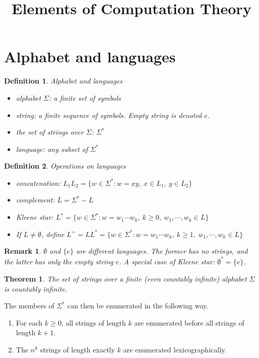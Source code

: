 \documentclass[aps,pra,onecolumn,notitlepage,superscriptaddress]{revtex4-1}
\newtheorem{theo}{Theorem}
\newtheorem{defi}{Definition}
\newtheorem{rem}{Remark}
\begin{document}
    \title{Elements of Computation Theory}
    \author{}
    \maketitle
    
    \section{ Alphabet and languages}
    \begin{defi}
        Alphabet and languages
        \begin{itemize}
            \item alphabet $\Sigma$: a finite set of symbols
            \item string: a finite sequence of symbols. Empty string is denoted $e$.
            \item the set of strings over $\Sigma$: $\Sigma^*$
            \item language: any subset of $\Sigma^*$
        \end{itemize}
    \end{defi}

    \begin{defi}
        Operations on languages
        \begin{itemize}
            \item concatenation: $L_1L_2 = \{ w \in \Sigma^* : w = xy, \ x \in L_1,\ y \in L_2 \}$
            \item complement: $\overline{L} = \Sigma^* - L$
            \item Kleene star: $L^* = \{ w \in \Sigma^* : w = w_1\cdots w_k, \ k \geq 0,\ w_1, \cdots, w_k \in L \}$
            \item If $L \neq \emptyset$, define $L^+ = LL^* = \{ w \in \Sigma^* : w = w_1\cdots w_k, \ k \geq 1,\ w_1, \cdots, w_k \in L \}$
        \end{itemize}
    \end{defi}

    \begin{rem}
        $\emptyset$ and $\{ e \}$ are different languages. The former has no strings, and the latter has only the empty string $e$. A special case of Kleene star: $\emptyset^* = \{ e \}$. 
    \end{rem}

    \begin{theo}
        The set of strings over a finite (even countably infinite) alphabet $\Sigma$ is countably infinite. 
    \end{theo}
    The members of $\Sigma^*$ can then be enumerated in the following way.
    \begin{enumerate}
        \item For each $k \geq 0$, all strings of length $k$ are enumerated before all strings of length $k + 1$.
        \item The $n^k$ strings of length exactly $k$ are enumerated lexicographically.
    \end{enumerate} 
    
\end{document}
